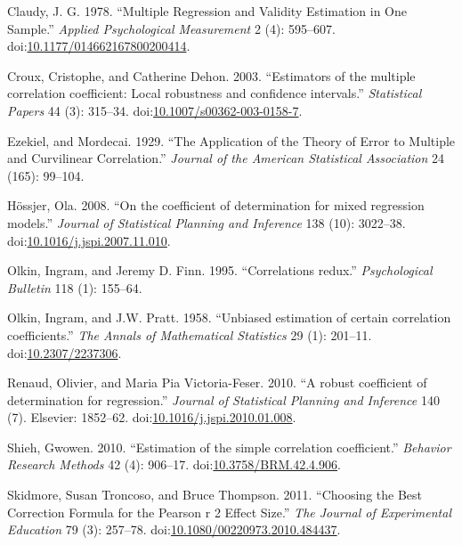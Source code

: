 \documentclass[]{article}
\begin{document}
\hypertarget{ref-Claudy1978}{}
Claudy, J. G. 1978. ``Multiple Regression and Validity Estimation in One
Sample.'' \emph{Applied Psychological Measurement} 2 (4): 595--607.
doi:\href{https://doi.org/10.1177/014662167800200414}{10.1177/014662167800200414}.

\hypertarget{ref-Croux2003}{}
Croux, Cristophe, and Catherine Dehon. 2003. ``Estimators of the
multiple correlation coefficient: Local robustness and confidence
intervals.'' \emph{Statistical Papers} 44 (3): 315--34.
doi:\href{https://doi.org/10.1007/s00362-003-0158-7}{10.1007/s00362-003-0158-7}.

\hypertarget{ref-Ezekiel1929}{}
Ezekiel, and Mordecai. 1929. ``The Application of the Theory of Error to
Multiple and Curvilinear Correlation.'' \emph{Journal of the American
Statistical Association} 24 (165): 99--104.

\hypertarget{ref-Hossjer2008}{}
Hössjer, Ola. 2008. ``On the coefficient of determination for mixed
regression models.'' \emph{Journal of Statistical Planning and
Inference} 138 (10): 3022--38.
doi:\href{https://doi.org/10.1016/j.jspi.2007.11.010}{10.1016/j.jspi.2007.11.010}.

\hypertarget{ref-Olkin1995}{}
Olkin, Ingram, and Jeremy D. Finn. 1995. ``Correlations redux.''
\emph{Psychological Bulletin} 118 (1): 155--64.

\hypertarget{ref-Olkin1958}{}
Olkin, Ingram, and J.W. Pratt. 1958. ``Unbiased estimation of certain
correlation coefficients.'' \emph{The Annals of Mathematical Statistics}
29 (1): 201--11.
doi:\href{https://doi.org/10.2307/2237306}{10.2307/2237306}.

\hypertarget{ref-Renaud2010}{}
Renaud, Olivier, and Maria Pia Victoria-Feser. 2010. ``A robust
coefficient of determination for regression.'' \emph{Journal of
Statistical Planning and Inference} 140 (7). Elsevier: 1852--62.
doi:\href{https://doi.org/10.1016/j.jspi.2010.01.008}{10.1016/j.jspi.2010.01.008}.

\hypertarget{ref-Shieh2010}{}
Shieh, Gwowen. 2010. ``Estimation of the simple correlation
coefficient.'' \emph{Behavior Research Methods} 42 (4): 906--17.
doi:\href{https://doi.org/10.3758/BRM.42.4.906}{10.3758/BRM.42.4.906}.

\hypertarget{ref-Skidmore2011}{}
Skidmore, Susan Troncoso, and Bruce Thompson. 2011. ``Choosing the Best
Correction Formula for the Pearson r 2 Effect Size.'' \emph{The Journal
of Experimental Education} 79 (3): 257--78.
doi:\href{https://doi.org/10.1080/00220973.2010.484437}{10.1080/00220973.2010.484437}.
\end{document}
